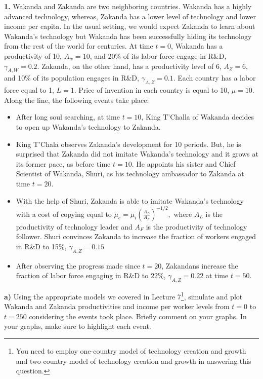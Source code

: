 \documentclass[11pt]{article}
\begin{document}
\noindent \textbf{1.} Wakanda and Zakanda are two neighboring countries. Wakanda has a highly advanced technology, whereas, Zakanda has a lower level of technology and lower income per capita. In the usual setting, we would expect Zakanda to learn about Wakanda's technology but Wakanda has been successfully hiding its technology from the rest of the world for centuries. At time $t=0$, Wakanda has a productivity of 10, $A_w = 10$, and 20\% of its labor force engage in R\&D, $\gamma_{A,W} = 0.2$.  Zakanda, on the other hand, has a productivity level of 6, $A_Z=6$, and 10\% of its population engages in R\&D, $\gamma_{A,Z}=0.1$. Each country has a labor force equal to 1, $L=1$. Price of invention in each country is equal to 10, $\mu = 10$. Along the line, the following events take place:
\begin{itemize}
\item After long soul searching, at time $t=10$, King T'Challa of Wakanda decides to open up Wakanda's technology to Zakanda.
\item King T'Chala observes Zakanda's development for 10 periods. But, he is surprised that Zakanda did not imitate Wakanda's technology and it grows at its former pace, as before time $t=10$. He appoints his sister and Chief Scientist of Wakanda, Shuri, as his technology ambassador to Zakanda at time $t=20$.
\item With the help of Shuri, Zakanda is able to imitate Wakanda's technology with a cost of copying equal to $\mu_{c} = \mu_i \left(\frac{A_L}{A_F} \right)^{-1/2},$ where $A_L$ is the productivity of technology leader and $A_F$ is the productivity of technology follower. Shuri convinces Zakanda to increase the fraction of workers engaged in R\&D to 15\%, $\gamma_{A,Z}=0.15$
\item After observing the progress made since $t=20$, Zakandans increase the fraction of labor force engaging in R\&D to 22\%, $\gamma_{A,Z}=0.22 $ at time $t=50.$
\end{itemize}

\newpage

\textbf{a)} Using the appropriate models we covered in Lecture 7\footnote{You need to employ one-country model of technology creation and growth and two-country model of technology creation and growth
in answering this question.}, simulate and plot Wakanda and Zakanda productivities and income per worker levels from $t=0$ to $t=250$ considering the events took place. Briefly comment on your graphs. In your graphs, make sure to highlight each event.
\end{document}
